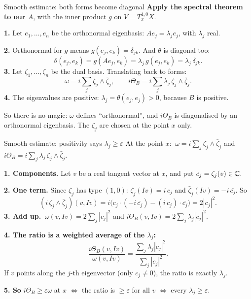 \begin{frame}{Smooth estimate: both forms become diagonal}
\label{fr:kv-proof-both-forms-23}
\textbf{Apply the spectral theorem to our \(A\)}, with the inner product \(g\) on \(V=T^{1,0}_xX\).
\par\medskip
\textbf{1.} Let \(e_1,\ldots,e_n\) be the orthonormal eigenbasis: \(Ae_j=\lambda_je_j\), with \(\lambda_j\) real.
\par\medskip
\textbf{2.} Orthonormal for \(g\) means \(g(e_j,e_k)=\delta_{jk}\). And \(\theta\) is diagonal too:
\[
\theta(e_j,e_k)=g(Ae_j,e_k)=\lambda_j\,g(e_j,e_k)=\lambda_j\,\delta_{jk}.
\]
\textbf{3.} Let \(\zeta_1,\ldots,\zeta_n\) be the dual basis. Translating back to forms:
\[
\omega=i\sum_j\zeta_j\wedge\bar\zeta_j,
\qquad
i\Theta_B=i\sum_j\lambda_j\,\zeta_j\wedge\bar\zeta_j .
\]
\textbf{4.} The eigenvalues are positive: \(\lambda_j=\theta(e_j,e_j)>0\), because \(B\) is positive.
\par\medskip
So there is no magic: \(\omega\) defines ``orthonormal'', and \(i\Theta_B\) is diagonalised by an orthonormal eigenbasis.
The \(\zeta_j\) are chosen at the point \(x\) only.
\end{frame}

\begin{frame}{Smooth estimate: positivity says \(\lambda_j\ge\varepsilon\)}
\label{fr:kv-proof-positivity-says-24}
At the point \(x\):
\(\ \omega=i\sum_j\zeta_j\wedge\bar\zeta_j\) and \(i\Theta_B=i\sum_j\lambda_j\,\zeta_j\wedge\bar\zeta_j\).
\par\medskip
\textbf{1. Components.} Let \(v\) be a real tangent vector at \(x\), and put \(c_j=\zeta_j(v)\in\mathbb C\).
\par\medskip
\textbf{2. One term.} Since \(\zeta_j\) has type \((1,0)\): \(\zeta_j(Iv)=i\,c_j\) and \(\bar\zeta_j(Iv)=-i\,\overline{c_j}\). So
\[
(i\,\zeta_j\wedge\bar\zeta_j)(v,Iv)
=i\bigl(c_j\cdot(-i\,\overline{c_j})-(i\,c_j)\cdot\overline{c_j}\bigr)=2|c_j|^2 .
\]
\textbf{3. Add up.}
\(\ \omega(v,Iv)=2\sum_j|c_j|^2\) and \(i\Theta_B(v,Iv)=2\sum_j\lambda_j|c_j|^2\).
\par\medskip
\textbf{4. The ratio is a weighted average of the \(\lambda_j\):}
\[
\frac{i\Theta_B(v,Iv)}{\omega(v,Iv)}=\frac{\sum_j\lambda_j|c_j|^2}{\sum_j|c_j|^2}.
\]
If \(v\) points along the \(j\)-th eigenvector (only \(c_j\ne0\)), the ratio is exactly \(\lambda_j\).
\par\medskip
\textbf{5. So} \(i\Theta_B\ge\varepsilon\omega\) at \(x\) \(\iff\) the ratio is \(\ge\varepsilon\) for all \(v\) \(\iff\) every \(\lambda_j\ge\varepsilon\).
\end{frame}


